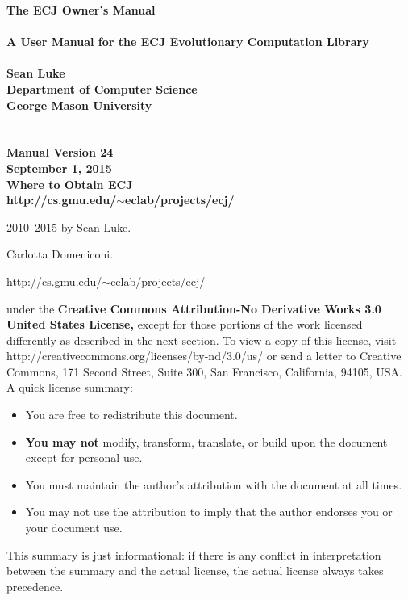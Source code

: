 \documentclass[twoside,10pt]{book}
\newcommand\booktitle{The ECJ Owner's Manual}
\newcommand\reference[1]{\vspace{0.5em}\hfill{\parbox{6in}{\raggedleft\noindent\textsf{#1}}}}
\begin{document}
\noindent\huge\bf \booktitle\\
\\
{\large\rm A User Manual for the ECJ Evolutionary Computation Library}\\
\\
\Large\bf Sean Luke\\
{\large\rm 
Department of Computer Science\\
George Mason University}
\\
\\
\\
\large\rm {\bf Manual Version 24}\\
\large\rm September 1, 2015\\

\vspace{5.6in}
\noindent\Large\bf Where to Obtain ECJ\\
\large\rm http:/\!/cs.gmu.edu/\!\(\sim\)eclab/projects/ecj/

\clearpage

\small 
{}  2010--2015 by Sean Luke.

\vspace{0.25in}
 Carlotta Domeniconi.

\vspace{0.25in}


\reference{http:/\!/cs.gmu.edu/\!\(\sim\)eclab/projects/ecj/}

\vspace{0.15in}

\vspace{0.15in}
	 under the {\bf Creative Commons Attribution-No Derivative Works 3.0 United States License,} except for those portions of the work licensed differently as described in the next section. To view a copy of this license, visit http:/\!/creativecommons.org/licenses/by-nd/3.0/us/ or send a letter to Creative Commons, 171 Second Street, Suite 300, San Francisco, California, 94105, USA.  A quick license summary:
	\begin{itemize}
	\item You are free to redistribute this document.
	\vspace{-0.5em}\item {\bf You may not} modify, transform, translate, or build upon the document except for personal use.   
	\vspace{-0.5em}\item You must maintain the author's attribution with the document at all times.
	\vspace{-0.5em}\item You may not use the attribution to imply that the author endorses you or your document use.  
	\end{itemize}
	This summary is just informational: if there is any conflict in interpretation between the summary and the actual license, the actual license always takes precedence.
\end{document}
